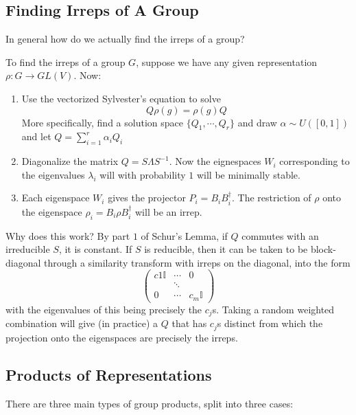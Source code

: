 \documentclass[9pt]{article}
\begin{document}
\begin{multicols}{2}
\subsection{Finding Irreps of A Group}

In general how do we actually find the irreps of a group?
\begin{algo}
    To find the irreps of a group $G$, suppose we have any 
    given representation $\rho: G \to GL(V)$. Now:
    \begin{enumerate}[label=(\alph*)]
        \item Use the vectorized Sylvester's equation to solve $$Q\rho(g)=\rho(g)Q$$
        More specifically, find a solution space $\{Q_1,\cdots,Q_r\}$ and draw $\alpha \sim U([0,1])$ and
        let $Q=\sum_{i=1}^{r}\alpha_i Q_i$
        \item Diagonalize the matrix $Q=S\Lambda S^{-1}$. Now the
        eignespaces $W_i$ corresponding to the eigenvalues $\lambda_i$ will with probability $1$ will be minimally
        stable. 
        \item Each eigenspace $W_i$ gives the projector $P_i=B_iB_i^{\dagger}$. The restriction of $\rho$ onto the
        eigenspace $\rho_i=B_i\rho B_i^{\dagger}$ will be an irrep.
    \end{enumerate}
\end{algo}

Why does this work? By part $1$ of Schur's Lemma, if $Q$ commutes
with an irreducible $S$, it is constant. If $S$ is reducible, then
it can be taken to be block-diagonal through a similarity transform
with irreps on the diagonal, into the form $$\begin{pmatrix} c1\mathbb{I} & \cdots & 0 \\
& \ddots & \\
0 & \cdots & c_{m}\mathbb{I} \end{pmatrix}$$
with the eigenvalues of this being precisely the $c_j$s. Taking
a random weighted combination will give (in practice) a $Q$ that
has $c_j$s distinct from which the projection onto the eigenspaces
are precisely the irreps. 

\subsection{Products of Representations}

There are three main types of group products, split into three cases:


\end{multicols}
\end{document}
